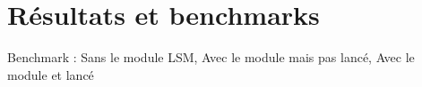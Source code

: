 \section{Résultats et benchmarks}

Benchmark : Sans le module LSM, Avec le module mais pas lancé, Avec le module et lancé
